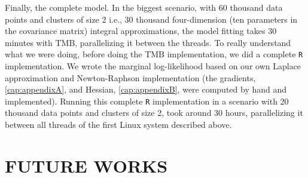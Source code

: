 Finally, the complete model. In the biggest scenario, with 60 thousand
data points and clusters of size 2 i.e., 30 thousand four-dimension (ten
parameters in the covariance matrix) integral approximations, the model
fitting takes 30 minutes with TMB, parallelizing it between the
threads. To really understand what we were doing, before doing the TMB
implementation, we did a complete \texttt{R} implementation. We wrote
the marginal log-likelihood based on our own Laplace approximation and
Newton-Raphson implementation (the gradients, \autoref{cap:appendixA},
and Hessian, \autoref{cap:appendixB}, were computed by hand and
implemented). Running this complete \texttt{R} implementation in a
scenario with 20 thousand data points and clusters of size 2, took
around 30 hours, parallelizing it between all threads of the first Linux
system described above.

\section{FUTURE WORKS}
\label{cap:future}

